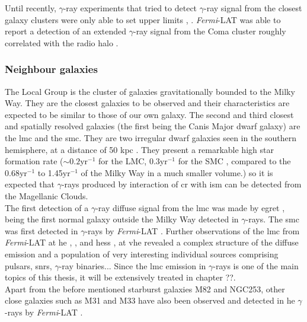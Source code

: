 \documentclass[main.tex]{subfiles}
\begin{document}
Until recently, $\gamma$-ray experiments that tried to detect $\gamma$-ray signal from the closest galaxy clusters were only able to set upper limits \cite{2010LimitsClustersFermi}, \cite{2012LimitsClustersMagic}. \textit{Fermi}-LAT was able to report a detection of an extended $\gamma$-ray signal from the Coma cluster roughly correlated with the radio halo \cite{2018ComaCluster}.\\

\subsubsection{Neighbour galaxies}

The Local Group is the cluster of galaxies gravitationally bounded to the Milky Way. They are the closest galaxies to be observed and their characteristics are expected to be similar to those of our own galaxy. The second and third closest and spatially resolved galaxies (the first being the Canis Major dwarf galaxy) are the \gls{lmc} and the \gls{smc}. They are two irregular dwarf galaxies seen in the southern hemisphere, at a distance of 50 kpc \cite{2018LMCdistance}. They present a remarkable high star formation rate ($\sim 0.2$yr$^{-1}$ for the LMC, $0.3$yr$^{-1}$ for the SMC \cite{2014LMCSFR}, compared to the 0.68yr$^{-1}$ to 1.45yr$^{-1}$ of the Milky Way \cite{2010MilkyWaySFR} in a much smaller volume.) so it is expected that $\gamma$-rays produced by interaction of \gls{cr} with \gls{ism} can be detected from the Magellanic Clouds.\\
The first detection of a $\gamma$-ray diffuse signal from the \gls{lmc} was made by \gls{egret} \cite{1992LMCEgret}, being the first normal galaxy outside the Milky Way detected in $\gamma$-rays. The \gls{smc} was first detected in $\gamma$-rays by \textit{Fermi}-LAT \cite{2010SMCFermi}. Further observations of the \gls{lmc} from \textit{Fermi}-LAT at \gls{he} \cite{2010LMCFermifirst}, \cite{2016LMCFermi6years}, \cite{2016LMCFermiBinary} and \gls{hess} \cite{2015LMCHess}, \cite{2012LMCHessfirst} at \gls{vhe} revealed a complex structure of the diffuse emission and a population of very interesting individual sources comprising pulsars, \glspl{snr}, $\gamma$-ray binaries... Since the \gls{lmc} emission in $\gamma$-rays is one of the main topics of this thesis, it will be extensively treated in chapter ??.\\
Apart from the before mentioned starburst galaxies M82 and NGC253, other close galaxies such as M31 and M33 have also been observed and detected in \gls{he} $\gamma$-rays by \textit{Fermi}-LAT \cite{2017M31M33Fermi}. 
\end{document}
